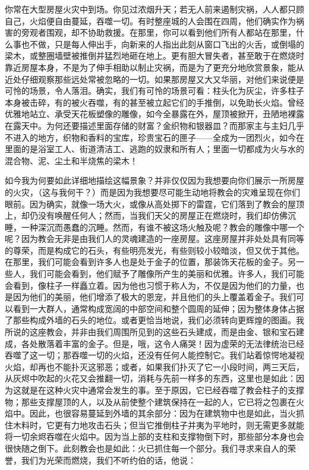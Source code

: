 你常在大型房屋火灾中到场。你见过浓烟升天；若无人前来遏制灾祸，人人都只顾自己，火焰便自由蔓延，吞噬一切。有时整座城的人会围在四周，他们确实作为祸害的旁观者围观，却不协助救援。在那里，你可以看到他们所有人都站在那里，什么事也不做，只是每人伸出手，向新来的人指出此刻从窗口飞出的火舌，或倒塌的梁木，或整圈墙壁被推倒并猛烈地砸在地上。更有胆大冒失者，甚至敢于在燃烧时靠近房屋本身，不是为了伸手相助以制止灾祸，而是为了更充分地欣赏景象，能从近处仔细观察那些远处常被忽略的一切。\newline{}如果那房屋又大又华丽，对他们来说便是可怜的场景，令人落泪。确实，我们有可怜的场景可看：柱头化为灰尘，许多柱子本身被击碎，有的被火吞噬，有的甚至被立起它们的手推倒，以免助长火焰。曾经优雅地站立、承受天花板塑像的雕像，如今全暴露在外，屋顶被掀开，丑陋地裸露在露天中。为何还要描述里面存储的财富？金织物和银器皿？而那家主与主妇几乎不进入的地方，织物和香料的宝库，珍贵宝石的匣子——全成为一团烈火，如今在里面的是浴室工人、街道清洁工、逃跑的奴隶和所有人；里面一切都成为火与水的混合物、泥、尘土和半烧焦的梁木！\par

如今我为何要如此详细地描绘这幅景象？并非仅仅因为我想要向你们展示一所房屋的火灾，（这与我何干？）而是因为我想要尽可能生动地将教会的灾难呈现在你们眼前。因为确实，就像一场大火，或像从高处掷下的雷霆，它们落到了教会的屋顶上，却仍没有唤醒任何人；然而，当我们天父的房屋正在燃烧时，我们却仿佛沉睡，一种深沉而愚蠢的沉睡。然而，有谁不被这场火触及呢？教会的雕像中哪一个呢？因为教会无非是由我们人的灵魂建造的一座房屋。这座房屋并非处处具有同等的尊荣，而是构成它的石头，有些明亮发光，有些则较小较暗淡，但又优于其他。在那里，我们可能会看到许多人也是处于金子的位置，那装饰天花板的金子。另一些人，我们可能会看到，他们赋予了雕像所产生的美丽和优雅。许多人，我们可能会看到，像柱子一样矗立着。因为他也习惯于称人为，不仅是因为他们的力量，也是因为他们的美丽，他们增添了极大的恩宠，并且他们的头上覆盖着金子。我们可以看到一大群人，通常构成宽阔的中部空间和整个圆周的延伸；因为整体身体占据了那些构成外墙的石头的地位。或者更恰当地说，我们必须转向更辉煌的图画。我所说的这座教会，并非由我们周围所见到的这些石头建成，而是由金、银和宝石建成，各处散落着丰富的金子。但是，哦，这令人痛哭！因为虚荣的无法律统治已经吞噬了这一切；那吞噬一切的火焰，还没有任何人能控制它。我们站着惊愕地凝视火焰，却再也不能扑灭这邪恶；或者，如果我们扑灭了它一小段时间，两三天后，从灰烬中吹起的火花又会推翻一切，消耗与先前一样多的东西，这里也是如此：因为这就是在这种火灾中通常会发生的事。至于原因，它已经吞噬了教会柱子的支撑物；那些支撑屋顶的人，以及从前使整个建筑保持在一起的人，它已将之包裹在火焰中。因此，也很容易蔓延到外墙的其余部分：因为在建筑物中也是如此，当火抓住木料时，它更有力地攻击石头；但当它推倒柱子并夷为平地时，则无需更多就能将一切余烬吞噬在火焰中。因为当上部的支柱和支撑物倒下时，那些部分本身也会很快随之倒下。此刻教会也是如此：火已抓住每一个部分。我们寻求来自人的荣誉，我们为光荣而燃烧，我们不听约伯的话，他说：\par

